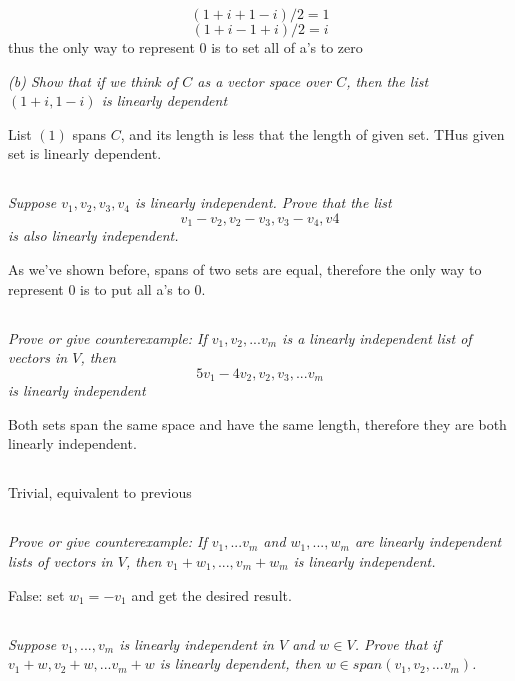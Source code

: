 \documentclass[11pt,oneside,titlepage]{book}
\begin{document}
$$(1 + i  + 1 - i)/2 = 1$$
$$(1 + i - 1 + i)/2 = i$$
thus the only way to represent $0$ is to set all of a's to zero

\textit{(b) Show that if we think of $C$ as a vector space over $C$, then
  the list $(1 + i, 1 - i)$ is linearly dependent}

List $(1)$ spans $C$, and its length is less that
the length of given set. THus given set is linearly dependent.


\subsection{}
\textit{Suppose $v_1, v_2, v_3, v_4$ is linearly independent.
  Prove that the list }
$$v_1 - v_2, v_2 - v_3, v_3 - v_4, v4$$
\textit{is also linearly independent.}

As we've shown before, spans of two sets are equal, therefore the only
way to represent $0$ is to put all a's to 0.



\subsection{}
\textit{Prove or give counterexample: If $v_1, v_2, ... v_m$ is a linearly
  independent list of vectors in $V$, then}
$$5v_1 - 4v_2, v_2, v_3, ... v_m$$
\textit{is linearly independent}

Both sets span the same space and have the same length, therefore they are
both linearly independent.

\subsection{}

Trivial, equivalent to previous

\subsection{}
\textit{Prove or give counterexample: If $v_1, ... v_m$ and $w_1, ..., w_m$ are
  linearly independent lists of vectors in $V$, then
  $v_1 + w_1, ..., v_m + w_m$ is linearly independent.}

False: set $w_1 = - v_1$ and get the desired result.

\subsection{}
\textit{Suppose $v_1, ..., v_m$ is linearly independent in $V$ and $w \in V$.
  Prove that if $v_1 + w, v_2 + w, ... v_m + w$ is linearly dependent,
  then $w \in span(v_1, v_2, ... v_m)$.}
\end{document}

